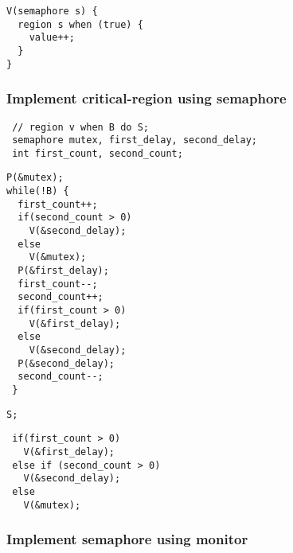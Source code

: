 \documentclass[CJKutf8,dvipsnames,table]{beamer}
\begin{document}
\begin{CJK*}{UTF8}{song}
\begin{frame}[fragile]
\begin{minipage}[c]{0.5\textwidth}
  \pause

\end{minipage}%
\begin{minipage}[c]{0.5\textwidth}

\begin{lstlisting}
V(semaphore s) {
  region s when (true) {
    value++;
  }
}
\end{lstlisting}

    \end{minipage}

\end{frame}

  \begin{frame}[fragile]
  \frametitle{Implement critical-region using semaphore} \pause

\begin{lstlisting}
 // region v when B do S;
 semaphore mutex, first_delay, second_delay;
 int first_count, second_count;
\end{lstlisting}
  \pause
  \begin{minipage}[c]{0.4\textwidth}

\begin{lstlisting}
P(&mutex);
while(!B) {
  first_count++;
  if(second_count > 0)
    V(&second_delay);
  else
    V(&mutex);
  P(&first_delay);
  first_count--;
  second_count++;
  if(first_count > 0)
    V(&first_delay);
  else
    V(&second_delay);
  P(&second_delay);
  second_count--;
 }
\end{lstlisting} \pause

  \end{minipage}%
  \begin{minipage}[c]{0.2\textwidth}

\begin{lstlisting}
S;
\end{lstlisting}

    \pause
  \end{minipage}%
  \begin{minipage}[c]{0.4\textwidth}

\begin{lstlisting}
 if(first_count > 0)
   V(&first_delay);
 else if (second_count > 0)
   V(&second_delay);
 else
   V(&mutex);
\end{lstlisting}

  \end{minipage}
\end{frame}

\fi

  \begin{frame}[fragile]
  \frametitle{Implement semaphore using monitor} \pause


\end{frame}
\end{CJK*}
\end{document}
